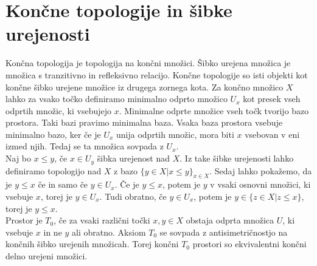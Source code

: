 \documentclass[mat1, tisk]{fmfdelo}
\begin{document}
\section{Končne topologije in šibke urejenosti}
Končna topologija je topologija na končni množici. Šibko urejena množica je množica s tranzitivno in refleksivno relacijo.
Končne topologije so isti objekti kot končne šibko urejene množice iz drugega zornega kota. Za končno množico $X$ lahko
za vsako točko definiramo minimalno odprto množico $U_x$ kot presek vseh odprtih
množic, ki vsebujejo $x$. Minimalne odprte množice vseh točk tvorijo bazo prostora.
Taki bazi pravimo minimalna baza. Vsaka baza prostora vsebuje minimalno bazo,
ker če je $U_x$ unija odprtih množic, mora biti $x$ vsebovan v eni izmed njih.
Tedaj se ta množica sovpada z $U_x$.\\
Naj bo $x \leq y$, če $x \in U_y$ šibka urejenost nad $X$. Iz take šibke urejenosti
lahko definiramo topologijo nad $X$ z bazo $\{y \in X | x \leq y\}_{x \in X}$.
Sedaj lahko pokažemo, da je $y \leq x$ če in samo če $y \in U_x$.
Če je $y \leq x$, potem je $y$ v vsaki osnovni množici, ki vsebuje $x$, torej je $y \in U_x$.
Tudi obratno, če $y \in U_x$, potem je $y \in \{z \in X | z \leq x\}$, torej  je $y \leq x$.\\
Prostor je $T_0$, če za vsaki različni točki $x,y \in X$ obstaja odprta množica
$U$, ki vsebuje $x$ in ne $y$ ali obratno. Aksiom $T_0$ se sovpada z antisimetričnostjo na
končnih šibko urejenih množicah. Torej končni $T_0$ prostori so ekvivalentni končni delno urejeni množici.\\
\end{document}

